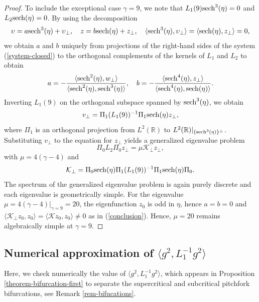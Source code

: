 \documentclass[12pt,reqno]{amsart}
\numberwithin{equation}{section}
\begin{document}
\begin{proof}
To include the exceptional case $\gamma = 9$, we note that $L_1(9) {\rm sech}^3(\eta) = 0$ and $L_2 {\rm sech}(\eta) =0$. By using the decomposition 
$$
\upsilon = a {\rm sech}^3(\eta) + \upsilon_{\perp}, \quad z = b {\rm sech}(\eta) + z_{\perp}, \quad \langle {\rm sech}^3(\eta), \upsilon_{\perp} \rangle = \langle {\rm sech}(\eta), z_{\perp} \rangle = 0,
$$
we obtain $a$ and $b$ uniquely from projections of the right-hand sides of the system (\ref{system-closed}) to the orthogonal complements 
of the kernels of $L_1$ and $L_2$ to obtain 
$$
a = -\frac{\langle {\rm sech}^2(\eta),w_{\perp} \rangle}{\langle {\rm sech}^2(\eta), {\rm sech}^3(\eta) \rangle}, \quad 
b = -\frac{\langle {\rm sech}^4(\eta),z_{\perp} \rangle}{\langle {\rm sech}^4(\eta), {\rm sech}(\eta) \rangle}.
$$
Inverting $L_1(9)$ on the orthogonal subspace spanned by ${\rm sech}^3(\eta)$, we obtain 
$$
v_{\perp} = \Pi_1 (L_1(9))^{-1} \Pi_1 {\rm sech}(\eta) z_{\perp},
$$ 
where $\Pi_1$ is an orthogonal projection from $L^2(\mathbb{R})$ to $L^2(\mathbb{R}) |_{\{ {\rm sech}^3(\eta) \}^{\perp}}$. Substituting $v_{\perp}$ to the equation for $z_{\perp}$ yields a generalized eigenvalue problem 
\begin{equation*}
    \Pi_0 L_2 \Pi_0 z_{\perp} = \mu \mathcal{K}_{\perp} z_{\perp}, 
\end{equation*}
with $\mu = 4(\gamma - 4)$ and 
\begin{equation*}
\mathcal{K}_{\perp} = \Pi_0 {\rm sech}(\eta) \Pi_1 (L_1(9))^{-1} \Pi_1 {\rm sech}(\eta) \Pi_0.
\end{equation*}
The spectrum of the generalized eigenvalue problem is again purely discrete and each eigenvalue is geometrically simple. For 
the eigenvalue $\mu = 4 (\gamma - 4) |_{\gamma = 9} = 20$, the eigenfunction $z_0$ is 
odd in $\eta$, hence $a = b = 0$ and $\langle \mathcal{K}_{\perp} z_0, z_0 \rangle = \langle \mathcal{K} z_0, z_0 \rangle \neq 0$ as in (\ref{conclusion}). Hence, $\mu = 20$ remains algebraically simple at $\gamma = 9$. 
\end{proof}


\subsection{Numerical approximation of $\langle g^2, L_1^{-1} g^2 \rangle$}

Here, we check numerically the value of  $\langle g^2, L_1^{-1} g^2 \rangle$, which appears in Proposition \ref{theorem-bifurcation-first} to separate the 
supercritical and subcritical pitchfork bifurcations, see Remark \ref{rem-bifucations}.
\end{document}
